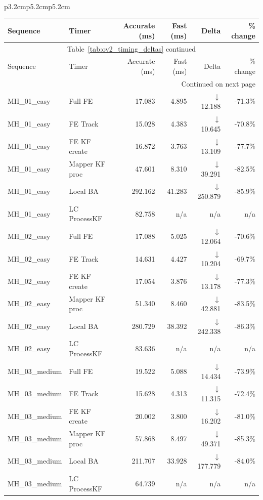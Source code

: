 \documentclass[11pt]{article}
\begin{document}
\begin{table}[ht]
\begin{tabular}{p{3.2cm}p{5.2cm}p{5.2cm}}
\begin{longtable}{llrrrr}
\toprule
Sequence & Timer & Accurate (ms) & Fast (ms) & Delta & \% change \\
\midrule
\endfirsthead
\multicolumn{6}{c}{Table~\ref{tab:ov2_timing_deltas} continued} \\
\toprule
Sequence & Timer & Accurate (ms) & Fast (ms) & Delta & \% change \\
\midrule
\endhead
\midrule
\multicolumn{6}{r}{Continued on next page} \\
\endfoot
\bottomrule
\endlastfoot
MH\_01\_easy & Full FE & 17.083 & 4.895 & $\downarrow$ 12.188 & -71.3\% \\
MH\_01\_easy & FE Track & 15.028 & 4.383 & $\downarrow$ 10.645 & -70.8\% \\
MH\_01\_easy & FE KF create & 16.872 & 3.763 & $\downarrow$ 13.109 & -77.7\% \\
MH\_01\_easy & Mapper KF proc & 47.601 & 8.310 & $\downarrow$ 39.291 & -82.5\% \\
MH\_01\_easy & Local BA & 292.162 & 41.283 & $\downarrow$ 250.879 & -85.9\% \\
MH\_01\_easy & LC ProcessKF & 82.758 & n/a & n/a & n/a \\
MH\_02\_easy & Full FE & 17.088 & 5.025 & $\downarrow$ 12.064 & -70.6\% \\
MH\_02\_easy & FE Track & 14.631 & 4.427 & $\downarrow$ 10.204 & -69.7\% \\
MH\_02\_easy & FE KF create & 17.054 & 3.876 & $\downarrow$ 13.178 & -77.3\% \\
MH\_02\_easy & Mapper KF proc & 51.340 & 8.460 & $\downarrow$ 42.881 & -83.5\% \\
MH\_02\_easy & Local BA & 280.729 & 38.392 & $\downarrow$ 242.338 & -86.3\% \\
MH\_02\_easy & LC ProcessKF & 83.636 & n/a & n/a & n/a \\
MH\_03\_medium & Full FE & 19.522 & 5.088 & $\downarrow$ 14.434 & -73.9\% \\
MH\_03\_medium & FE Track & 15.628 & 4.313 & $\downarrow$ 11.315 & -72.4\% \\
MH\_03\_medium & FE KF create & 20.002 & 3.800 & $\downarrow$ 16.202 & -81.0\% \\
MH\_03\_medium & Mapper KF proc & 57.868 & 8.497 & $\downarrow$ 49.371 & -85.3\% \\
MH\_03\_medium & Local BA & 211.707 & 33.928 & $\downarrow$ 177.779 & -84.0\% \\
MH\_03\_medium & LC ProcessKF & 64.739 & n/a & n/a & n/a \\

\end{longtable}
\end{tabular}
\end{table}
\end{document}
